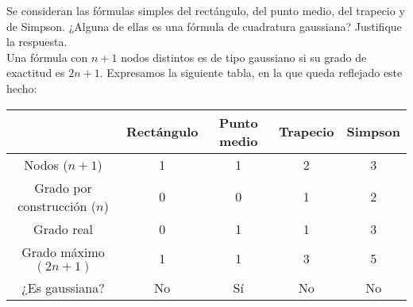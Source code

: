 \begin{ejercicio}\label{ej:2.1.21}
    Se consideran las fórmulas simples del rectángulo, del punto medio, del trapecio y de Simpson. ¿Alguna de ellas es una fórmula de cuadratura gaussiana? Justifique la respuesta.\\

    Una fórmula con $n+1$ nodos distintos es de tipo gaussiano si su grado de exactitud es $2n+1$. Expresamos la siguiente tabla, en la que queda reflejado este hecho:
    \begin{center}
        \begin{tabular}{c|c|c|c|c}
            & Rectángulo & Punto medio & Trapecio & Simpson \\
            \hline
            Nodos ($n+1$) & 1 & 1 & 2 & 3 \\
            Grado por construcción ($n$) & 0 & 0 & 1 & 2 \\
            Grado real & 0 & 1 & 1 & 3 \\
            Grado máximo $(2n+1)$ & 1 & 1 & 3 & 5 \\
            ¿Es gaussiana? & No & Sí & No & No
        \end{tabular}
    \end{center}
\end{ejercicio}

